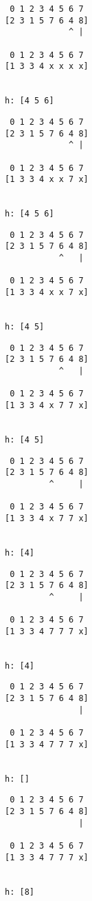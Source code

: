 { \begin{verbatim}
 0 1 2 3 4 5 6 7
[2 3 1 5 7 6 4 8]
             ^ |

 0 1 2 3 4 5 6 7
[1 3 3 4 x x x x]


h: [4 5 6]
\end{verbatim} }

{ \begin{verbatim}
 0 1 2 3 4 5 6 7
[2 3 1 5 7 6 4 8]
             ^ |

 0 1 2 3 4 5 6 7
[1 3 3 4 x x 7 x]


h: [4 5 6]
\end{verbatim} }

{ \begin{verbatim}
 0 1 2 3 4 5 6 7
[2 3 1 5 7 6 4 8]
           ^   |

 0 1 2 3 4 5 6 7
[1 3 3 4 x x 7 x]


h: [4 5]
\end{verbatim} }

{ \begin{verbatim}
 0 1 2 3 4 5 6 7
[2 3 1 5 7 6 4 8]
           ^   |

 0 1 2 3 4 5 6 7
[1 3 3 4 x 7 7 x]


h: [4 5]
\end{verbatim} }

{ \begin{verbatim}
 0 1 2 3 4 5 6 7
[2 3 1 5 7 6 4 8]
         ^     |

 0 1 2 3 4 5 6 7
[1 3 3 4 x 7 7 x]


h: [4]
\end{verbatim} }

{ \begin{verbatim}
 0 1 2 3 4 5 6 7
[2 3 1 5 7 6 4 8]
         ^     |

 0 1 2 3 4 5 6 7
[1 3 3 4 7 7 7 x]


h: [4]
\end{verbatim} }

{ \begin{verbatim}
 0 1 2 3 4 5 6 7
[2 3 1 5 7 6 4 8]
               |

 0 1 2 3 4 5 6 7
[1 3 3 4 7 7 7 x]


h: []
\end{verbatim} }

{ \begin{verbatim}
 0 1 2 3 4 5 6 7
[2 3 1 5 7 6 4 8]
               |

 0 1 2 3 4 5 6 7
[1 3 3 4 7 7 7 x]


h: [8]
\end{verbatim} }

